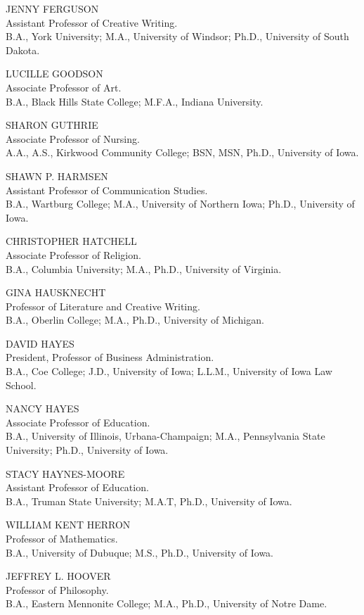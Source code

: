 \documentclass[
  letterpaper,
]{scrbook}
\begin{document}
JENNY FERGUSON\\
Assistant Professor of Creative Writing.\\
B.A., York University; M.A., University of Windsor; Ph.D., University of
South Dakota.

LUCILLE GOODSON\\
Associate Professor of Art.\\
B.A., Black Hills State College; M.F.A., Indiana University.

SHARON GUTHRIE\\
Associate Professor of Nursing.\\
A.A., A.S., Kirkwood Community College; BSN, MSN, Ph.D., University of
Iowa.

SHAWN P. HARMSEN\\
Assistant Professor of Communication Studies.\\
B.A., Wartburg College; M.A., University of Northern Iowa; Ph.D.,
University of Iowa.

CHRISTOPHER HATCHELL\\
Associate Professor of Religion.\\
B.A., Columbia University; M.A., Ph.D., University of Virginia.

GINA HAUSKNECHT\\
Professor of Literature and Creative Writing.\\
B.A., Oberlin College; M.A., Ph.D., University of Michigan.

DAVID HAYES\\
President, Professor of Business Administration.\\
B.A., Coe College; J.D., University of Iowa; L.L.M., University of Iowa
Law School.

NANCY HAYES\\
Associate Professor of Education.\\
B.A., University of Illinois, Urbana-Champaign; M.A., Pennsylvania State
University; Ph.D., University of Iowa.

STACY HAYNES-MOORE\\
Assistant Professor of Education.\\
B.A., Truman State University; M.A.T, Ph.D., University of Iowa.

WILLIAM KENT HERRON\\
Professor of Mathematics.\\
B.A., University of Dubuque; M.S., Ph.D., University of Iowa.

JEFFREY L. HOOVER\\
Professor of Philosophy.\\
B.A., Eastern Mennonite College; M.A., Ph.D., University of Notre Dame.
\end{document}
